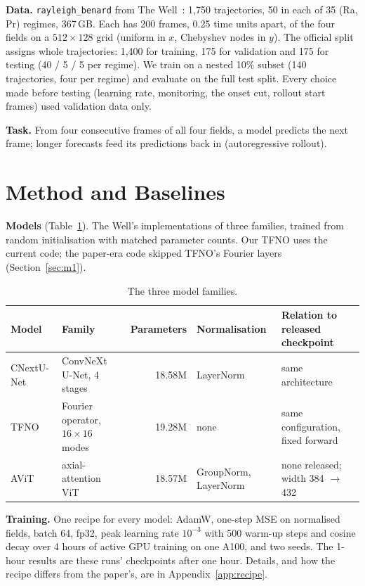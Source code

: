 \documentclass[11pt]{article}
\begin{document}
\textbf{Data.} \texttt{rayleigh\_benard} from The Well~\cite{ohana2024well,wellrb}: 1,750 trajectories, 50 in each
of 35 (Ra, Pr) regimes, 367\,GB. Each has 200 frames, 0.25 time units apart, of the four fields on a
$512\times128$ grid (uniform in $x$, Chebyshev nodes in $y$). The official split assigns whole trajectories: 1,400
for training, 175 for validation and 175 for testing (40 / 5 / 5 per regime). We train on a nested 10\% subset (140
trajectories, four per regime) and evaluate on the full test split. Every choice made before testing (learning
rate, monitoring, the onset cut, rollout start frames) used validation data only.

\textbf{Task.} From four consecutive frames of all four fields, a model predicts the next frame; longer forecasts
feed its predictions back in (autoregressive rollout).

\section{Method and Baselines}
\label{sec:method}

\textbf{Models} (Table~\ref{tab:models}). The Well's implementations of three families, trained from random
initialisation with matched parameter counts. Our TFNO uses the current code; the paper-era code skipped TFNO's
Fourier layers (Section~\ref{sec:m1}).

\begin{table}[!htbp]
\centering\footnotesize
\begin{tabularx}{\linewidth}{@{}llrl>{\raggedright\arraybackslash}X@{}}
\toprule
Model & Family & Parameters & Normalisation & Relation to released checkpoint \\
\midrule
CNextU-Net~\cite{liu2022convnext} & ConvNeXt U-Net, 4 stages & 18.58M & LayerNorm & same architecture \\
TFNO~\cite{li2021fno,kossaifi2024tfno} & Fourier operator, $16{\times}16$ modes & 19.28M & none & same configuration, fixed forward \\
AViT~\cite{mccabe2024mpp} & axial-attention ViT & 18.57M & GroupNorm, LayerNorm & none released; width 384 $\to$ 432 \\
\bottomrule
\end{tabularx}
\caption{The three model families.}
\label{tab:models}
\end{table}

\textbf{Training.} One recipe for every model: AdamW, one-step MSE on normalised fields, batch 64, fp32, peak
learning rate $10^{-3}$ with 500 warm-up steps and cosine decay over 4 hours of active GPU training on one A100, and
two seeds. The 1-hour results are these runs' checkpoints after one hour. Details, and how the recipe differs from
the paper's, are in Appendix~\ref{app:recipe}.
\end{document}
